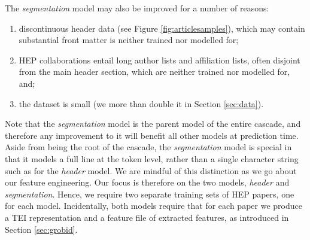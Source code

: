 The \emph{segmentation} model may also be improved for a number of reasons:

\begin{enumerate}
\item discontinuous header data (see Figure \ref{fig:articlesamples}), which may contain substantial front matter is neither trained nor modelled for;
\item HEP collaborations entail long author lists and affiliation lists, often disjoint from the main header section, which are neither trained nor modelled for, and;
\item the dataset is small (we more than double it in Section \ref{sec:data}).
\end{enumerate}

Note that the \emph{segmentation} model is the parent model of the entire cascade, and therefore any improvement to it will benefit all other models at prediction time. Aside from being the root of the cascade, the \emph{segmentation} model is special in that it models a full line at the token level, rather than a single character string such as for the \emph{header} model. We are mindful of this distinction as we go about our feature engineering. Our focus is therefore on the two models, \emph{header} and \emph{segmentation}. Hence, we require two separate training sets of HEP papers, one for each model. Incidentally, both models require that for each paper we produce a TEI representation and a feature file of extracted features, as introduced in Section \ref{sec:grobid}.


